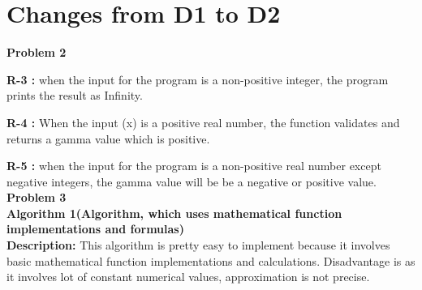 \documentclass[12pt]{report}
\begin{document}
\renewcommand{\thesection}{\arabic{section}}
\section{Changes from D1 to D2}
 


\textbf{Problem 2}

\textbf{R-3 :} when the input for the program is a non-positive integer, the program prints the result as Infinity.

\textbf{R-4 :}  When the input (x) is a positive real number, the function validates and returns a gamma value which is positive.

\textbf{R-5 :} when the input for the program is a non-positive real number except negative integers, the gamma value will be be a negative or positive value.
\\

\textbf{Problem 3}\\

\textbf{Algorithm 1(Algorithm, which uses mathematical function implementations and formulas) }\\

\textbf{Description: }This algorithm is pretty easy to implement because it involves basic mathematical function implementations and calculations. Disadvantage is as it involves lot of constant numerical values, approximation is not precise.
\end{document}
